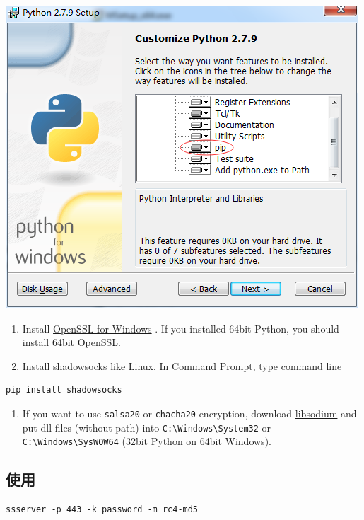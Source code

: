 \documentclass[11pt,a4paper]{sphinxmanual}
\begin{document}
\includegraphics[keepaspectratio,max width=0.95\linewidth]{images/0b91b9fa-9650-11e4-9782-44526d25f2fa.png}

\begin{enumerate}
\item Install \href{https://slproweb.com/products/Win32OpenSSL.html}{OpenSSL for Windows} . If you installed 64bit Python, you should install 64bit OpenSSL.
\item Install shadowsocks like Linux. In Command Prompt, type command line
\end{enumerate}

\begin{Verbatim}
pip install shadowsocks
\end{Verbatim}

\begin{enumerate}
\item If you want to use \verb~salsa20~ or \verb~chacha20~ encryption, download \href{http://download.libsodium.org/libsodium/releases/}{libsodium} and put dll files (without path) into \verb~C:\Windows\System32~ or \verb~C:\Windows\SysWOW64~ (32bit Python on 64bit Windows).
\end{enumerate}


\subsection{使用}
\label{sec-2-1-2}
\begin{Verbatim}
ssserver -p 443 -k password -m rc4-md5
\end{Verbatim}
\end{document}
